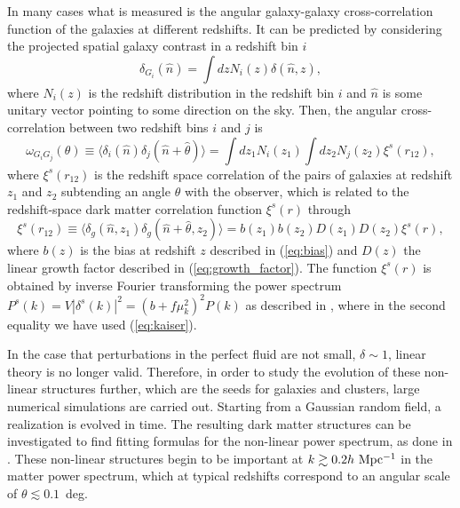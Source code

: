 In many cases what is measured is the angular galaxy-galaxy cross-correlation function of the galaxies at different redshifts. It can be predicted by considering the projected spatial galaxy contrast in a redshift bin $i$
\begin{equation}
\delta_{G_i}(\hat{n}) = \int dz N_i(z) \delta (\hat{n}, z),
\end{equation}
where $N_i(z)$ is the redshift distribution in the redshift bin $i$ and $\hat{n}$ is some unitary vector pointing to some direction on the sky. Then, the angular cross-correlation between two redshift bins $i$ and $j$ is
\begin{equation}
\omega_{G_iG_j} (\theta) \equiv \langle \delta_i (\hat{n}) \delta_j(\hat{n}+\hat{\theta}) \rangle = \int dz_1 N_i(z_1) \int dz_2 N_j(z_2) \xi^s(r_{12}),
\label{eq:corr_prediction}
\end{equation}
where $\xi^s(r_{12})$ is the redshift space correlation of the pairs of galaxies at redshift $z_1$ and $z_2$ subtending an angle $\theta$ with the observer, which is related to the redshift-space dark matter correlation function $\xi^s(r)$ through 
\begin{equation}
\xi^s(r_{12}) \equiv \langle \delta_g (\hat{n},z_1) \delta_g(\hat{n}+\hat{\theta},z_2) \rangle=b(z_1)b(z_2)D(z_1)D(z_2) \xi^s(r),
\end{equation}
where $b(z)$ is the bias at redshift $z$ described in (\ref{eq:bias}) and $D(z)$ the linear growth factor described in (\ref{eq:growth_factor}). The function $\xi^s(r)$ is obtained by inverse Fourier transforming the power spectrum $P^s(k)=V|\delta^s(k)|^2=(b+f\mu_k^2)^2P(k)$ as described in \citet{Hamilton1992}, where in the second equality we have used (\ref{eq:kaiser}).

In the case that perturbations in the perfect fluid are not small, $\delta \sim 1$, linear theory is no longer valid. Therefore, in order to study the evolution of these non-linear structures further, which are the seeds for galaxies and clusters, large numerical simulations are carried out. Starting from a Gaussian random field, a realization is evolved in time. The resulting dark matter structures can be investigated to find fitting formulas for the non-linear power spectrum, as done in \citet{Smith2003}. These non-linear structures begin to be important at $k\gtrsim0.2h\ \rm Mpc^{-1}$ in the matter power spectrum, which at typical redshifts correspond to an angular scale of $\theta \lesssim 0.1$~deg.

